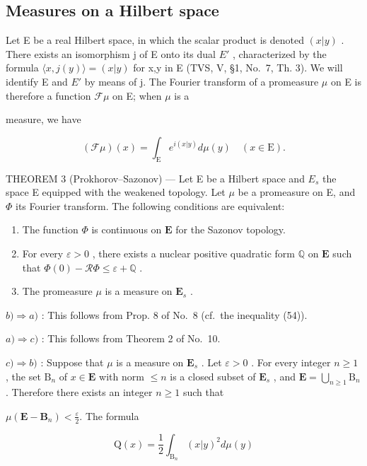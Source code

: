 \subsection{Measures on a Hilbert space}

Let E be a real Hilbert space, in which the scalar product is denoted \((x|y)\) . There exists an isomorphism j of E onto its dual \(E'\) , characterized by the formula \(\langle x,j(y)\rangle=(x|y)\) for x,y in E (TVS, V, §1, No.~7, Th. 3). We will identify E and \(E'\) by means of j. The Fourier transform of a promeasure \(\mu\) on E is therefore a function \(\mathcal{F}\mu\) on E; when \(\mu\) is a

measure, we have

\[
(\mathcal {F} \mu) (x) = \int_ {\mathrm{E}} e ^ {i (x | y)} d \mu (y) \quad (x \in \mathrm{E}).\tag{64}
\]

THEOREM 3 (Prokhorov--Sazonov) --- Let E be a Hilbert space and \(E_{s}\) the space E equipped with the weakened topology. Let \(\mu\) be a promeasure on E, and \(\Phi\) its Fourier transform. The following conditions are equivalent:

\begin{enumerate}
\def\labelenumi{\alph{enumi})}
\item
  The function \(\Phi\) is continuous on \(\mathbf{E}\) for the Sazonov topology.
\item
  For every \(\varepsilon > 0\) , there exists a nuclear positive quadratic form \(\mathbb{Q}\) on \(\mathbf{E}\) such that \(\Phi(0) - \mathcal{R}\Phi \leqslant \varepsilon + \mathbb{Q}\) .
\item
  The promeasure \(\mu\) is a measure on \(\mathbf{E}_s\) .
\end{enumerate}

\(b) \Rightarrow a)\) : This follows from Prop. 8 of No.~8 (cf.~the inequality (54)).

\(a) \Rightarrow c)\) : This follows from Theorem 2 of No.~10.

\(c) \Rightarrow b)\) : Suppose that \(\mu\) is a measure on \(\mathbf{E}_s\) . Let \(\varepsilon > 0\) . For every integer \(n \geqslant 1\) , the set \(\mathrm{B}_n\) of \(x \in \mathbf{E}\) with norm \(\leqslant n\) is a closed subset of \(\mathbf{E}_s\) , and \(\mathbf{E} = \bigcup_{n \geqslant 1} \mathrm{B}_n\) . Therefore there exists an integer \(n \geqslant 1\) such that

\(\mu (\mathbf{E} - \mathbf{B}_n) <   \frac{\varepsilon}{2}.\) The formula

\[
\mathrm{Q} (x) = \frac {1}{2} \int_ {\mathrm{B} _ {n}} (x | y) ^ {2} d \mu (y)\tag{65}
\]

